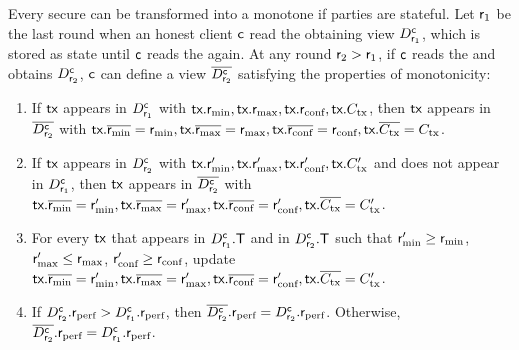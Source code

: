\begin{remark}
	Every secure \podtm can be transformed into a monotone \podtm if parties are stateful. Let $\textsf{r}_1$ be the last round when an honest client $\textsf{c}$ read the \podtm obtaining view $D_{\textsf{r}_1}^{\textsf{c}}$, which is stored as state until $\textsf{c}$ reads the \podtm again. At any round $\textsf{r}_2>\textsf{r}_1$, if $\textsf{c}$ reads the \podtm and obtains $D_{\textsf{r}_2}^{\textsf{c}}$, $\textsf{c}$ can define a view $\overline{D_{\textsf{r}_2}^{\textsf{c}}}$ satisfying the properties of \podtm monotonicity:

	\begin{enumerate}
		\item If $\textsf{tx}$ appears in $D_{\textsf{r}_1}^{\textsf{c}}$ with $\textsf{tx}.\textsf{r}_\text{min},\textsf{tx}.\textsf{r}_\text{max},\textsf{tx}.\textsf{r}_\text{conf},\textsf{tx}.C_\text{tx}$, then $\textsf{tx}$ appears in $\overline{D_{\textsf{r}_2}^{\textsf{c}}}$ with $\textsf{tx}.\overline{\textsf{r}_\text{min}}=\textsf{r}_\text{min},\textsf{tx}.\overline{\textsf{r}_\text{max}}=\textsf{r}_\text{max},\textsf{tx}.\overline{\textsf{r}_\text{conf}}=\textsf{r}_\text{conf},\textsf{tx}.\overline{C_\text{tx}}=C_\text{tx}$.
		\item If $\textsf{tx}$ appears in $D_{\textsf{r}_2}^{\textsf{c}}$ with $\textsf{tx}.\textsf{r}_\text{min}',\textsf{tx}.\textsf{r}_\text{max}',\textsf{tx}.\textsf{r}_\text{conf}',\textsf{tx}.C_\text{tx}'$ and does not appear in $D_{\textsf{r}_1}^{\textsf{c}}$, then $\textsf{tx}$ appears in $\overline{D_{\textsf{r}_2}^{\textsf{c}}}$ with $\textsf{tx}.\overline{\textsf{r}_\text{min}}=\textsf{r}_\text{min}',\textsf{tx}.\overline{\textsf{r}_\text{max}}=\textsf{r}_\text{max}',\textsf{tx}.\overline{\textsf{r}_\text{conf}}=\textsf{r}_\text{conf}',\textsf{tx}.\overline{C_\text{tx}}=C_\text{tx}'$.
		\item For every $\textsf{tx}$ that appears in $D_{\textsf{r}_1}^{\textsf{c}}.\textsf{T}$ and in  $D_{\textsf{r}_2}^{\textsf{c}}.\textsf{T}$ such that $\textsf{r}_\text{min}'\geq \textsf{r}_\text{min}$, $\textsf{r}_\text{max}' \leq \textsf{r}_\text{max}$, $\textsf{r}_\text{conf}' \geq \textsf{r}_\text{conf}$, update $\textsf{tx}.\overline{\textsf{r}_\text{min}}=\textsf{r}_\text{min}',\textsf{tx}.\overline{\textsf{r}_\text{max}}=\textsf{r}_\text{max}',\textsf{tx}.\overline{\textsf{r}_\text{conf}}=\textsf{r}_\text{conf}',\textsf{tx}.\overline{C_\text{tx}}=C_\text{tx}'$.
		\item If  $D_{\textsf{r}_2}^{\textsf{c}}.\textsf{r}_\text{perf} > D_{\textsf{r}_1}^{\textsf{c}}.\textsf{r}_\text{perf}$, then $\overline{D_{\textsf{r}_2}^{\textsf{c}}}.\textsf{r}_\text{perf}=D_{\textsf{r}_2}^{\textsf{c}}.\textsf{r}_\text{perf} $. Otherwise, $\overline{D_{\textsf{r}_2}^{\textsf{c}}}.\textsf{r}_\text{perf}=D_{\textsf{r}_1}^{\textsf{c}}.\textsf{r}_\text{perf} $.

	\end{enumerate}
\end{remark}











